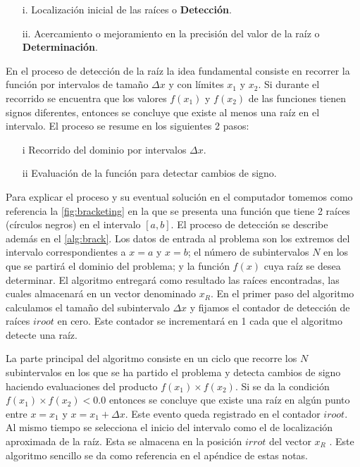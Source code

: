 \begin{itemize}
	\item[i.] Localización inicial de las raíces o {\bf Detección}.
	\item[ii.] Acercamiento o mejoramiento en la precisión del valor de la
	raíz o {\bf Determinación}.
\end{itemize}

En el proceso de detección de la raíz la idea fundamental consiste en recorrer 
la función por intervalos de tamaño $\Delta x$ y con límites $x_1$ y $x_2$. Si 
durante el recorrido se encuentra que los valores $f(x_1)$ y $f(x_2)$ de las 
funciones tienen signos diferentes, entonces se concluye que existe al menos 
una raíz en el intervalo. El proceso se resume en los siguientes 2 pasos:

\begin{itemize}
	\item[i]  Recorrido del dominio por intervalos $\Delta x$.
	\item[ii] Evaluación de la función para detectar cambios de signo.
\end{itemize}

Para explicar el proceso y su eventual solución en el computador tomemos como 
referencia la \cref{fig:bracketing} en la que se presenta una función que tiene 
2 raíces (círculos negros) en el intervalo $[a,b]$. El proceso de detección se 
describe además en el \cref{alg:brack}. Los datos de entrada al problema son 
los extremos del intervalo correspondientes a $x=a$ y $x=b$; el número de 
subintervalos $N$ en los que se partirá el dominio del problema; y la función 
$f(x)$ cuya raíz se desea determinar.  El algoritmo entregará como resultado 
las raíces encontradas, las cuales almacenará en un vector denominado $x_R$. En 
el primer paso del algoritmo calculamos el tamaño del subintervalo $\Delta x$ y 
fijamos el contador de detección de raíces $iroot$ en cero. Este contador se 
incrementará en 1 cada que el algoritmo detecte una raíz.

La parte principal del algoritmo consiste en un ciclo que recorre los $N$ 
subintervalos en los que se ha partido el problema y detecta cambios de signo 
haciendo evaluaciones del producto $f (x_1) \times f (x_2).$ Si se da la 
condición $f \left( x_1 \right) \times f \left( x_2 \right) < 0.0$ entonces se 
concluye que existe una raíz en algún punto entre $x=x_1$ y $x=x_1+ \Delta x$. 
Este evento queda registrado en el contador $iroot$. Al mismo tiempo se 
selecciona el inicio del intervalo como el de localización aproximada de la 
raíz. Esta se almacena en la posición $irrot$ del vector $x_R$ . Este algoritmo 
sencillo se da como referencia en el apéndice de estas notas.

